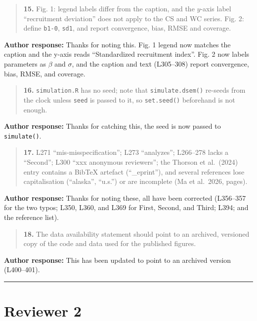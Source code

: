 \documentclass[11pt]{article}
\begin{document}
\begin{quote}
\textbf{15.} Fig. 1: legend labels differ from the caption, and the
\(y\)-axis label ``recruitment deviation'' does not apply to the CS and
WC series. Fig. 2: define \texttt{b1-0}, \texttt{sd1}, and report
convergence, bias, RMSE and coverage.
\end{quote}

\textbf{Author response:} Thanks for noting this. Fig. 1 legend now
matches the caption and the y-axis reads ``Standardized recruitment
index''. Fig. 2 now labels parameters as \(\beta\) and \(\sigma\), and
the caption and text (L305--308) report convergence, bias, RMSE, and
coverage.

\begin{quote}
\textbf{16.} \texttt{simulation.R} has no seed; note that
\texttt{simulate.dsem()} re-seeds from the clock unless \texttt{seed} is
passed to it, so \texttt{set.seed()} beforehand is not enough.
\end{quote}

\textbf{Author response:} Thanks for catching this, the seed is now
passed to \texttt{simulate()}.

\begin{quote}
\textbf{17.} L271 ``mis-misspecification''; L273 ``analyzes''; L266--278
lacks a ``Second''; L300 ``xxx anonymous reviewers''; the Thorson et
al.~(2024) entry contains a BibTeX artefact (``\_eprint''), and several
references lose capitalisation (``alaska'', ``u.s.'') or are incomplete
(Ma et al.~2026, pages).
\end{quote}

\textbf{Author response:} Thanks for noting these, all have been
corrected (L356--357 for the two typos; L350, L360, and L369 for First,
Second, and Third; L394; and the reference list).

\begin{quote}
\textbf{18.} The data availability statement should point to an
archived, versioned copy of the code and data used for the published
figures.
\end{quote}

\textbf{Author response:} This has been updated to point to an archived
version (L400--401).

\begin{center}\rule{0.5\linewidth}{0.5pt}\end{center}

\section{Reviewer 2}\label{reviewer-2}
\end{document}
